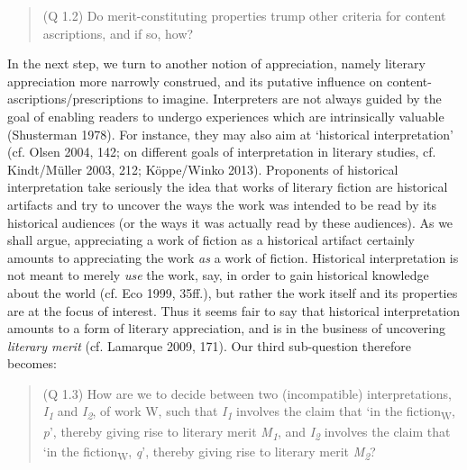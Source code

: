 \vspace{-.2cm}
\begin{quote}
(Q 1.2)  Do merit-constituting properties trump other criteria for
content ascriptions, and if so, how?
\end{quote}
\vspace{-.2cm}

\noindent In the next step, we turn to another notion of appreciation, namely
literary appreciation more narrowly construed, and its putative
influence on content-ascriptions/prescriptions to imagine. Interpreters
are not always guided by the goal of enabling readers to undergo
experiences which are intrinsically valuable (Shusterman 1978). For
instance, they may also aim at `historical interpretation' (cf. Olsen
2004, 142; on different goals of interpretation in literary studies, cf.
Kindt/M\"uller 2003, 212; K\"oppe/Winko 2013). Proponents of historical
interpretation take seriously the idea that works of literary fiction
are historical artifacts and try to uncover the ways the work was
intended to be read by its historical audiences (or the ways it was
actually read by these audiences). As we shall argue, appreciating a
work of fiction as a historical artifact certainly amounts to
appreciating the work \emph{as} a work of fiction. Historical
interpretation is not meant to merely \emph{use} the work, say, in order
to gain historical knowledge about the world (cf. Eco 1999, 35ff.), but
rather the work itself and its properties are at the focus of interest.
Thus it seems fair to say that historical interpretation amounts to a
form of literary appreciation, and is in the business of uncovering
\emph{literary merit} (cf. Lamarque 2009, 171). Our third sub-question
therefore becomes:

\vspace{-.2cm}
\begin{quote}
(Q 1.3)  How are we to decide between two (incompatible)
interpretations, \emph{I\textsubscript{1}} and
\emph{I\textsubscript{2}}, of work W, such  that
\emph{I\textsubscript{1}} involves the claim that `in the
fiction\textsubscript{W}, \emph{p}', thereby giving rise to literary
merit \emph{M\textsubscript{1}}, and  \emph{I\textsubscript{2}}
involves the claim that `in the fiction\textsubscript{W}, \emph{q}',
thereby giving rise to literary merit \emph{M\textsubscript{2}}?
\end{quote}
\vspace{-.2cm}

